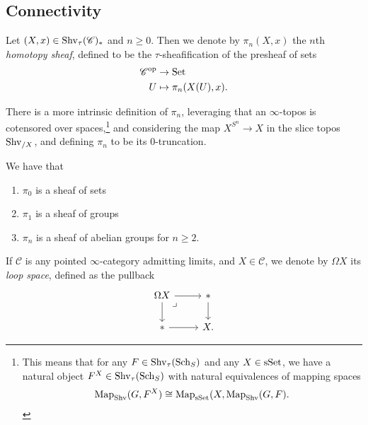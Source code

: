 \documentclass[11pt]{amsart}
\begin{document}
\subsection{Connectivity}



\begin{definition} Let $(X,x)\in\mathrm{Shv}_\tau(\mathscr{C})_\ast$ and $n\ge0$. Then we denote by $\pi_n(X,x)$ the $n$th \textit{homotopy sheaf}, defined to be the $\tau$-sheafification of the presheaf of sets
\begin{align*}
    \mathscr{C}^{\mathrm{op}} &\to \mathrm{Set} \\
    U &\mapsto \pi_n(X(U),x).
\end{align*}
\end{definition}

\begin{remark} There is a more intrinsic definition of $\pi_n$, leveraging that an $\infty$-topos is cotensored over spaces,\footnote{%
This means that for any $F \in \mathrm{Shv}_\tau(\mathrm{Sch}_S)$ and any $X \in \mathrm{sSet}$, we have a natural object $F^X\in \mathrm{Shv}_\tau(\mathrm{Sch}_S)$ with natural equivalences of mapping spaces
\begin{align*}
    \mathrm{Map}_{\mathrm{Shv}}(G,F^X) \cong \mathrm{Map}_{\mathrm{sSet}}(X,\mathrm{Map}_{\mathrm{Shv}}(G,F).
\end{align*}
}
and considering the map $X^{S^n} \to X$ in the slice topos $\mathrm{Shv}_{/X}$, and defining $\pi_n$ to be its 0-truncation.
\end{remark}


\begin{proposition} We have that
\begin{enumerate}
    \item $\pi_0$ is a sheaf of sets
    \item $\pi_1$ is a sheaf of groups
    \item $\pi_n$ is a sheaf of abelian groups for $n\ge 2$.
\end{enumerate}
\end{proposition}

\begin{notation} If $\mathscr{C}$ is any pointed $\infty$-category admitting limits, and $X\in \mathscr{C}$, we denote by $\Omega X$ its \textit{loop space}, defined as the pullback
\[ \begin{tikzcd}
    \Omega X\rar\dar\pb & \ast\dar\\
    \ast\rar & X.
\end{tikzcd} \]
\end{notation}
\end{document}
